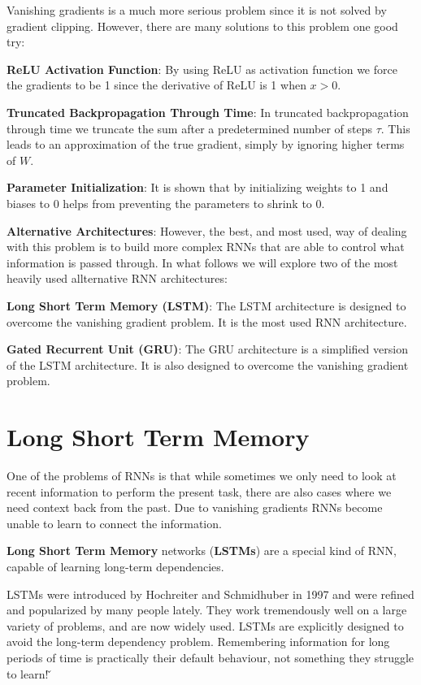Vanishing gradients is a much more serious problem since it is not solved by gradient clipping. However, there are
many solutions to this problem one good try:
\bit
\item \textbf{ReLU Activation Function}: By using ReLU as activation function we force the gradients to be 1 since the
derivative of ReLU is 1 when $x>0$.
\item \textbf{Truncated Backpropagation Through Time}: In truncated backpropagation through time we truncate the sum
after a predetermined number of steps $\tau$. This leads to an approximation of the true gradient, simply by ignoring
higher terms of $W$.
\item \textbf{Parameter Initialization}: It is shown that by initializing weights to 1 and biases to 0 helps from
preventing the parameters to shrink to 0.
\item \textbf{Alternative Architectures}: However, the best, and most used, way of dealing with this problem is to
build more complex RNNs that are able to control what information is passed through. In what follows we will explore two
of the most heavily used allternative RNN architectures:
\bit
\item \textbf{Long Short Term Memory (LSTM)}: The LSTM architecture is designed to overcome the vanishing gradient
problem. It is the most used RNN architecture.
\item \textbf{Gated Recurrent Unit (GRU)}: The GRU architecture is a simplified version of the LSTM architecture.
It is also designed to overcome the vanishing gradient problem.
\eit
\eit

\section{Long Short Term Memory}

One of the problems of RNNs is that while sometimes we only need to look at recent information to perform the present
task, there are also cases where we need context back from the past. Due to vanishing gradients RNNs become unable to
learn to connect the information.

\textbf{Long Short Term Memory} networks (\textbf{LSTMs}) are a special kind of RNN, capable of learning long-term
dependencies.
\ed

LSTMs were introduced by Hochreiter and Schmidhuber in 1997 and were refined and popularized by many people lately.
They work tremendously well on a large variety of problems, and are now widely used. LSTMs are explicitly designed to
avoid the long-term dependency problem. Remembering information for long periods of time is practically their default
behaviour, not something they struggle to learn! \v

